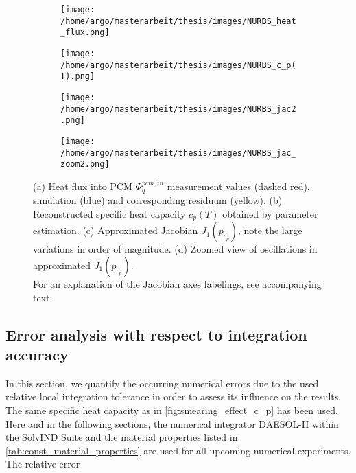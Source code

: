 \documentclass{scrartcl}[12pt, halfparskip]
\numberwithin{equation}{section}
\numberwithin{figure}{section}
\numberwithin{table}{section}
\begin{document}
\begin{figure}[H]
	\begin{subfigure}{0.49\textwidth}
		\texttt{[image: /home/argo/masterarbeit/thesis/images/NURBS\_heat\_flux.png]}
		\caption{}
	\end{subfigure}
	\begin{subfigure}{0.49\textwidth}
		\texttt{[image: /home/argo/masterarbeit/thesis/images/NURBS\_c\_p(T).png]}
		\caption{}
	\end{subfigure}
	\begin{subfigure}{0.49\textwidth}
		\hspace{0.1cm}
		\texttt{[image: /home/argo/masterarbeit/thesis/images/NURBS\_jac2.png]}
		\caption{}
	\end{subfigure}
	\begin{subfigure}{0.49\textwidth}
		\hspace{0.4cm}
		\texttt{[image: /home/argo/masterarbeit/thesis/images/NURBS\_jac\_zoom2.png]}
		\caption{}
	\end{subfigure}
	\caption{(a) Heat flux into PCM $\varPhi_q^{pcm,in}$ measurement values (dashed red), simulation (blue) and corresponding residuum (yellow). (b) Reconstructed specific heat capacity $c_p(T)$ obtained by parameter estimation. (c) Approximated Jacobian $J_1(p_{c_p})$, note the large variations in order of magnitude. (d) Zoomed view of oscillations in approximated $J_1(p_{c_p})$. \\
	For an explanation of the Jacobian axes labelings, see accompanying text.}
	\label{fig:NURBS_results}
\end{figure}




\subsection{Error analysis with respect to integration accuracy}
In this section, we quantify the occurring numerical errors due to the used relative local integration tolerance in order to assess its influence on the results. The same specific heat capacity as in \cref{fig:smearing_effect_c_p} has been used. \\
Here and in the following sections, the numerical integrator DAESOL-II within the SolvIND Suite and the material properties listed in \cref{tab:const_material_properties} are used for all upcoming numerical experiments. \\
The relative error
\end{document}
